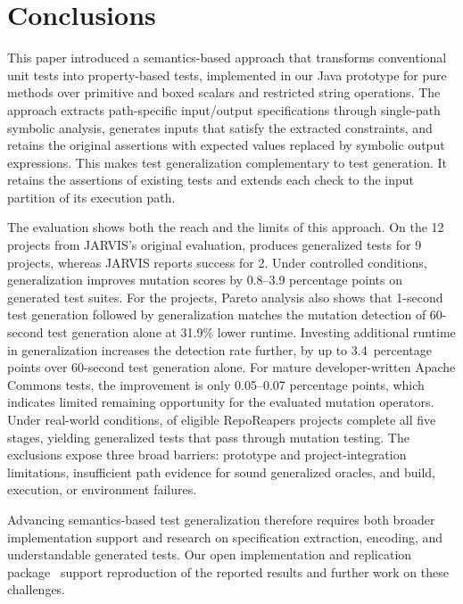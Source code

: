 \section{Conclusions}
\label{sec:conclusions}

This paper introduced a semantics-based approach that transforms
conventional unit tests into property-based tests,
implemented in our Java prototype \ToolTeralizer{} for pure methods
over primitive and boxed scalars and restricted string operations.
The approach extracts path-specific input/output specifications through single-path symbolic analysis,
generates inputs that satisfy the extracted constraints,
and retains the original assertions with expected values replaced by symbolic output expressions.
This makes test generalization complementary to test generation.
It retains the assertions of existing tests
and extends each check to the input partition of its execution path.

The evaluation shows both the reach and the limits of this approach.
On the 12 projects from JARVIS's original evaluation,
\ToolTeralizer{} produces generalized tests for 9 projects,
whereas JARVIS reports success for 2.
Under controlled conditions, generalization improves mutation scores
by 0.8--3.9 percentage points on generated test suites.
For the \DatasetsEqBenchEs{} projects, Pareto analysis also shows
that 1-second test generation followed by generalization
matches the mutation detection of 60-second test generation alone at 31.9\% lower runtime.
Investing additional runtime in generalization increases the detection rate further,
by up to 3.4~percentage points over 60-second test generation alone.
For mature developer-written Apache Commons tests,
the improvement is only 0.05--0.07 percentage points,
which indicates limited remaining opportunity for the evaluated mutation operators.
Under real-world conditions, \TzRealworldApplicabilityProjects{} of
\TzRealworldEligibleProjects{} eligible RepoReapers projects complete all five stages,
yielding \TzRealworldGeneralizationsFinalUsable{} generalized tests that pass through mutation testing.
The exclusions expose three broad barriers:
prototype and project-integration limitations,
insufficient path evidence for sound generalized oracles,
and build, execution, or environment failures.

Advancing semantics-based test generalization therefore requires
both broader implementation support and research on specification extraction,
encoding, and understandable generated tests.
Our open implementation and replication package~\cite{replicationpackage}
support reproduction of the reported results and further work on these challenges.
